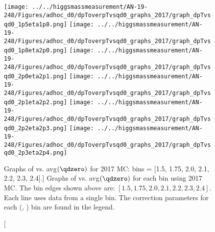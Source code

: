 \begin{figure}[!htbp]
    \centering
    { \texttt{[image: ../../higgsmassmeasurement/AN-19-248/Figures/adhoc\_d0/dpToverpTvsqd0\_graphs\_2017/graph\_dpTvsqd0\_1p5eta1p8.png]}}
    { \texttt{[image: ../../higgsmassmeasurement/AN-19-248/Figures/adhoc\_d0/dpToverpTvsqd0\_graphs\_2017/graph\_dpTvsqd0\_1p8eta2p0.png]}}
    { \texttt{[image: ../../higgsmassmeasurement/AN-19-248/Figures/adhoc\_d0/dpToverpTvsqd0\_graphs\_2017/graph\_dpTvsqd0\_2p0eta2p1.png]}}
    { \texttt{[image: ../../higgsmassmeasurement/AN-19-248/Figures/adhoc\_d0/dpToverpTvsqd0\_graphs\_2017/graph\_dpTvsqd0\_2p1eta2p2.png]}}
    { \texttt{[image: ../../higgsmassmeasurement/AN-19-248/Figures/adhoc\_d0/dpToverpTvsqd0\_graphs\_2017/graph\_dpTvsqd0\_2p2eta2p3.png]}}
    { \texttt{[image: ../../higgsmassmeasurement/AN-19-248/Figures/adhoc\_d0/dpToverpTvsqd0\_graphs\_2017/graph\_dpTvsqd0\_2p3eta2p4.png]}}
    \caption
        [Graphs of \pTmismeas vs. avg$(\qdzero)$ for 2017 MC: bins = [1.5, 1.75, 2.0, 2.1, 2.2, 2.3, 2.4].]
        { Graphs of \pTmismeas vs. avg$(\qdzero)$ for each \abseta bin using 2017 MC.
        The \abseta bin edges shown above are: $[1.5, 1.75, 2.0, 2.1, 2.2, 2.3, 2.4]$.
        Each line uses data from a single \pT bin. 
        The \pT correction parameters for each (\abseta, \pT) bin are found in the legend.
    }
\end{figure}

